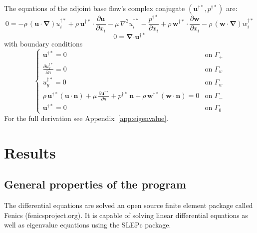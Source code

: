 \documentclass[12pt, a4paper]{article}
\begin{document}
        The equations of the adjoint base flow's complex conjugate $(\mathbf{u^{\dagger*}}, p^{\dagger*})$ are:
        \begin{equation}
            0 = - \rho \, (\mathbf{u \cdot} \boldsymbol{\nabla}) u^{\dagger*}_i + 
            \rho \, \mathbf{u^{\dagger*} \cdot} \frac{\partial \mathbf{u}}{\partial x_i} - 
            \mu \, \nabla^2 u^{\dagger*}_i - 
            \frac{p^{\dagger*}}{\partial x_i} + 
            \rho \, \mathbf{w^{\dagger*} \cdot} \frac{\partial \mathbf{w}}{\partial x_i} - 
            \rho \, (\mathbf{w \cdot} \boldsymbol{\nabla}) w^{\dagger*}_i
        \end{equation}
        \begin{equation}
            0 = \boldsymbol{\nabla} \mathbf{\cdot u^{\dagger*}}
        \end{equation}
        with boundary conditions
        \begin{equation}
        \begin{cases}
            \mathbf{u^{\dagger*}} = 0 & \text{on } \Gamma_+ \\
            \frac{\partial u^{\dagger*}_x}{\partial n} = 0 & \text{on } \Gamma_w \\
            u^{\dagger*}_y = 0 & \text{on } \Gamma_w \\
            \rho \, \mathbf{u^{\dagger*}} (\mathbf{u \cdot n}) + \mu \, \frac{\partial \mathbf{u^{\dagger*}}}{\partial n} + 
            p^{\dagger*} \, \mathbf{n} + \rho \, \mathbf{w^{\dagger*}} (\mathbf{w \cdot n}) = 0 & \text{on } \Gamma_- \\
            \mathbf{u^{\dagger*}} = 0 & \text{on } \Gamma_0
        \end{cases}
        \end{equation}
        For the full derivation see Appendix~\ref{app:eigenvalue}.
		
        
\section{Results}
    \subsection{General properties of the program}
        The differential equations are solved an open source finite element package called Fenics (fenicsproject.org). It is capable of solving linear differential equations as well as eigenvalue equations using the SLEPc package.
        
\end{document}

